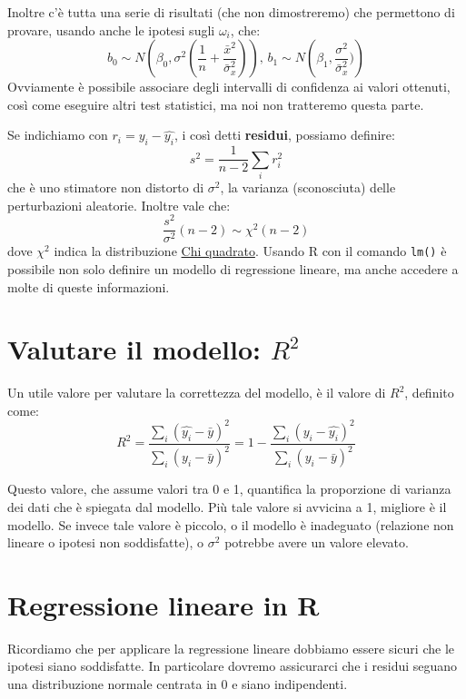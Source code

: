 \documentclass[]{book}
\begin{document}
Inoltre c'è tutta una serie di risultati (che non dimostreremo) che permettono di provare, usando anche le ipotesi sugli \(\omega_i\), che:
\[
b_0 \sim N\left( \beta_0, \sigma^2 (\frac{1}{n} + \frac{\bar{x}^2}{\bar{\sigma}_x^2}) \right), \, b_1 \sim N\left( \beta_1, \frac{\sigma^2}{\bar{\sigma}_x^2}) \right)
\]
Ovviamente è possibile associare degli intervalli di confidenza ai valori ottenuti, così come eseguire altri test statistici, ma noi non tratteremo questa parte.

Se indichiamo con \(r_i = y_i - \hat{y_i}\), i così detti \textbf{residui}, possiamo definire:
\[
s^2 = \frac{1}{n-2} \sum_i r_i^2 
\]
che è uno stimatore non distorto di \(\sigma^2\), la varianza (sconosciuta) delle perturbazioni aleatorie. Inoltre vale che:
\[
\frac{s^2}{\sigma^2}(n-2) \sim \chi^2(n-2)
\]
dove \(\chi^2\) indica la distribuzione \href{https://it.wikipedia.org/wiki/Distribuzione_chi_quadrato}{Chi quadrato}.
Usando R con il comando \texttt{lm()} è possibile non solo definire un modello di regressione lineare, ma anche accedere a molte di queste informazioni.

\hypertarget{valutare-il-modello-r2}{%
\section{\texorpdfstring{Valutare il modello: \(R^2\)}{Valutare il modello: R\^{}2}}\label{valutare-il-modello-r2}}

Un utile valore per valutare la correttezza del modello, è il valore di \(R^2\), definito come:
\[
R^2 = \frac{\sum_i (\hat{y_i} - \bar{y} )^2}{\sum_i (y_i - \bar{y})^2} = 1 -\frac{\sum_i (y_i - \hat{y_i})^2}{\sum_i (y_i - \bar{y})^2} 
\]

Questo valore, che assume valori tra 0 e 1, quantifica la proporzione di varianza dei dati che è spiegata dal modello. Più tale valore si avvicina a 1, migliore è il modello. Se invece tale valore è piccolo, o il modello è inadeguato (relazione non lineare o ipotesi non soddisfatte), o \(\sigma^2\) potrebbe avere un valore elevato.

\hypertarget{regressione-lineare-in-r}{%
\section{Regressione lineare in R}\label{regressione-lineare-in-r}}

Ricordiamo che per applicare la regressione lineare dobbiamo essere sicuri che le ipotesi siano soddisfatte. In particolare dovremo assicurarci che i residui seguano una distribuzione normale centrata in 0 e siano indipendenti.
\end{document}
